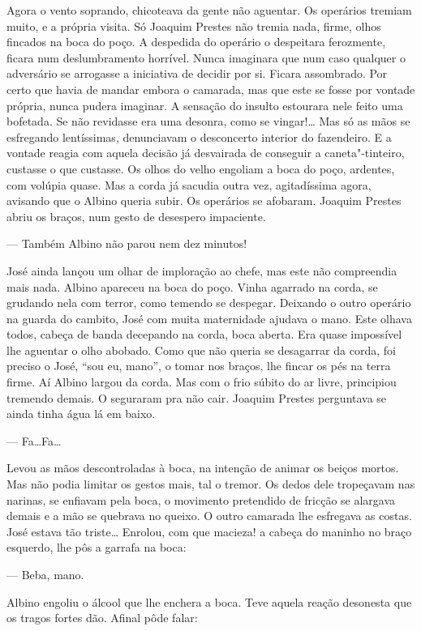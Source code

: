 \begin{linenumbers}
Agora o vento soprando, chicoteava da gente não aguentar. Os operários
tremiam muito, e a própria visita. Só Joaquim Prestes não tremia nada,
firme, olhos fincados na boca do poço. A despedida do operário o
despeitara ferozmente, ficara num deslumbramento horrível. Nunca
imaginara que num caso qualquer o adversário se arrogasse a iniciativa
de decidir por si. Ficara assombrado. Por certo que havia de mandar
embora o camarada, mas que este se fosse por vontade própria, nunca
pudera imaginar. A sensação do insulto estourara nele feito uma
bofetada. Se não revidasse era uma desonra, como se vingar!\ldots{} Mas só as
mãos se esfregando lentíssimas, denunciavam o desconcerto interior do
fazendeiro. E a vontade reagia com aquela decisão já desvairada de
conseguir a caneta"-tinteiro, custasse o que custasse. Os olhos do velho
engoliam a boca do poço, ardentes, com volúpia quase. Mas a corda já
sacudia outra vez, agitadíssima agora, avisando que o Albino queria
subir. Os operários se afobaram. Joaquim Prestes abriu os braços, num
gesto de desespero impaciente.

--- Também Albino não parou nem dez minutos!

José ainda lançou um olhar de imploração ao chefe, mas este não
compreendia mais nada. Albino apareceu na boca do poço. Vinha agarrado
na corda, se grudando nela com terror, como temendo se despegar.
Deixando o outro operário na guarda do cambito, José com muita
maternidade ajudava o mano. Este olhava todos, cabeça de banda decepando
na corda, boca aberta. Era quase impossível lhe aguentar o olho abobado.
Como que não queria se desagarrar da corda, foi preciso o José, ``sou
eu, mano'', o tomar nos braços, lhe fincar os pés na terra firme. Aí
Albino largou da corda. Mas com o frio súbito do ar livre, principiou
tremendo demais. O seguraram pra não cair. Joaquim Prestes perguntava se
ainda tinha água lá em baixo.

--- Fa\ldots{}Fa\ldots{}

Levou as mãos descontroladas à boca, na intenção de animar os beiços
mortos. Mas não podia limitar os gestos mais, tal o tremor. Os dedos
dele tropeçavam nas narinas, se enfiavam pela boca, o movimento
pretendido de fricção se alargava demais e a mão se quebrava no queixo.
O outro camarada lhe esfregava as costas. José estava tão triste\ldots{}
Enrolou, com que macieza! a cabeça do maninho no braço esquerdo, lhe pôs
a garrafa na boca:

--- Beba, mano.

Albino engoliu o álcool que lhe enchera a boca. Teve aquela reação
desonesta que os tragos fortes dão. Afinal pôde falar:


\end{linenumbers}
